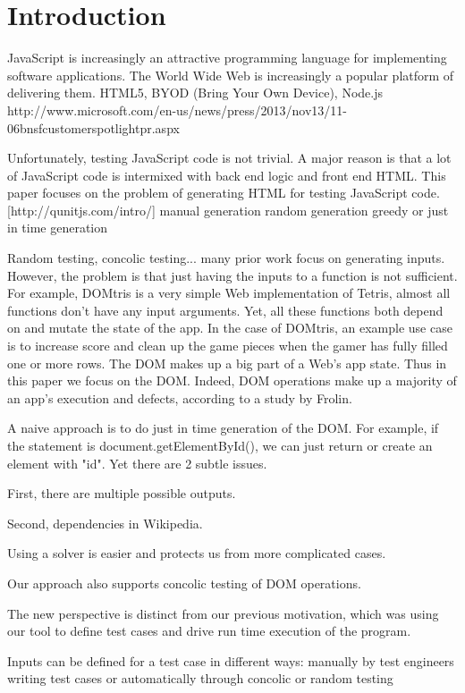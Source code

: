 \section{Introduction}

JavaScript is increasingly an attractive programming language for implementing software applications.
The World Wide Web is increasingly a popular platform of delivering them.
HTML5, BYOD (Bring Your Own Device), Node.js
http://www.microsoft.com/en-us/news/press/2013/nov13/11-06bnsfcustomerspotlightpr.aspx

Unfortunately, testing JavaScript code is not trivial.  
A major reason is that a lot of JavaScript code is intermixed with back end logic and front end HTML.  
This paper focuses on the problem of generating HTML for testing JavaScript code.
\cite{QUnitIntro}
[http://qunitjs.com/intro/] 
manual generation
random generation
greedy or just in time generation




Random testing, concolic testing... many prior work focus on generating inputs. 
However, the problem is that just having the inputs to a function is not sufficient.  
For example, DOMtris is a very simple Web implementation of Tetris, almost all functions don't have any input arguments.  
Yet, all these functions both depend on and mutate the state of the app.  
In the case of DOMtris, an example use case is to increase score and clean up the game pieces when the gamer has fully filled one or more rows.  
The DOM makes up a big part of a Web's app state.  
Thus in this paper we focus on the DOM.  
Indeed, DOM operations make up a majority of an app's execution and defects, according to a study by Frolin.  

A naive approach is to do just in time generation of the DOM.  
For example, if the statement is document.getElementById(), we can just return or create an element with "id".  
Yet there are 2 subtle issues.

First, there are multiple possible outputs.  

Second, dependencies in Wikipedia.  

Using a solver is easier and protects us from more complicated cases.

Our approach also supports concolic testing of DOM operations.



The new perspective is distinct from our previous motivation, which was using our tool to define test cases and drive run time execution of the program.  

Inputs can be defined for a test case in different ways: manually by test engineers writing test cases or automatically through concolic or random testing
